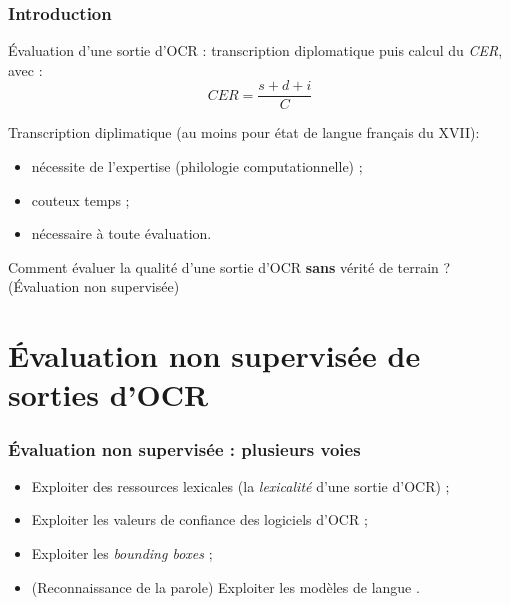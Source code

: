 \documentclass{beamer}
\begin{document}
	\begin{frame}\frametitle{Introduction}
		\'{E}valuation d'une sortie d'OCR : transcription diplomatique puis calcul du \textit{CER}, avec :
		$$CER = \frac{s + d + i}{C}$$
		
		Transcription diplimatique (au moins pour état de langue français du XVII\ieme):
		\begin{itemize}
			\item nécessite de l'expertise (philologie computationnelle) ;
			\item couteux temps ;
			\item nécessaire à toute évaluation.
		\end{itemize}

		\begin{center}
		Comment évaluer la qualité d'une sortie d'OCR \textbf{sans} vérité de terrain ? (\'{E}valuation non supervisée)
		\end{center}
	\end{frame}


	\section{\'{E}valuation non supervisée de sorties d'OCR}
		\begin{frame}\frametitle{\'{E}valuation non supervisée : plusieurs voies}
			\begin{itemize}
				\item Exploiter des ressources lexicales (la \textit{lexicalité} d'une sortie d'OCR) \cite{Springmann2016a} ;
				\item Exploiter les valeurs de confiance des logiciels d'OCR \cite{Springmann2016a} ;
				\item Exploiter les \textit{bounding boxes} \cite{Gupta2015a} ;
				\item (Reconnaissance de la parole) Exploiter les modèles de langue \cite{Chen1998a}.
			\end{itemize}
		\end{frame}
\end{document}
